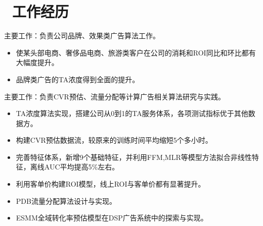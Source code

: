 \documentclass{resume}
\begin{document}



\section{\faUsers\ 工作经历}
\begin{onehalfspacing}
主要工作：负责公司品牌、效果类广告算法工作。
\begin{itemize}
\item 使某头部电商、奢侈品电商、旅游类客户在公司的消耗和ROI同比和环比都有大幅度提升。
\item 品牌类广告的TA浓度得到全面的提升。
\end{itemize}
\end{onehalfspacing}

\begin{onehalfspacing}
主要工作：负责CVR预估、流量分配等计算广告相关算法研究与实践。
\begin{itemize}
\item TA浓度算法实现，搭建公司从0到1的TA服务体系，各项测试指标优于其他数据方。 
\item 构建CVR预估数据流，较原来的训练时间平均缩短5个多小时。
\item 完善特征体系，新增9个基础特征，并利用FFM,MLR等模型方法拟合非线性特征，离线AUC平均提高5\%左右。
\item 利用客单价构建ROI模型，线上ROI与客单价都有显著提升。
\item PDB流量分配算法设计与实现。 
\item ESMM全域转化率预估模型在DSP广告系统中的探索与实现。
\end{itemize}
\end{onehalfspacing}
\end{document}
